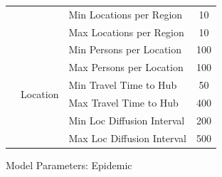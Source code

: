 \documentclass[11pt]{book}
\begin{document}
\begin{figure}
\begin{center}
\begin{tabular}{|| c | l | l | c ||}
                &                               & Min Locations per Region  & 10    \\
                &                               & Max Locations per Region  & 10    \\ \cline{2-4}
                & \multirow{6}{*}{Location}     & Min Persons per Location  & 100   \\
                &                               & Max Persons per Location  & 100   \\
                &                               & Min Travel Time to Hub    & 50    \\
                &                               & Max Travel Time to Hub    & 400   \\
                &                               & Min Loc Diffusion Interval& 200   \\
                &                               & Max Loc Diffusion Interval& 500   \\
            \hline
        \end{tabular}
        \caption{Model Parameters: Epidemic}\label{model_params1}
    \end{center}
\end{figure}



 \markright{ }
\end{document}
